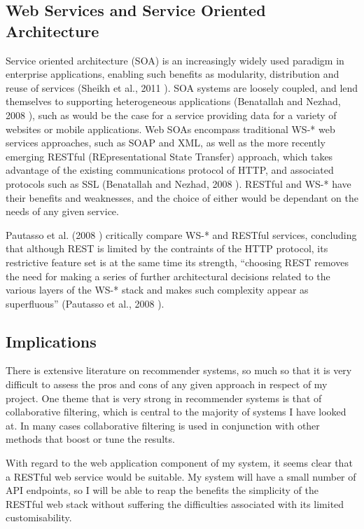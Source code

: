 \subsection{Web Services and Service Oriented Architecture}

Service oriented architecture (SOA) is an increasingly widely used paradigm in enterprise applications, enabling such benefits as modularity, distribution and reuse of services (Sheikh et al., 2011 \cite{Sheikh11}). SOA systems are loosely coupled, and lend themselves to supporting heterogeneous applications (Benatallah and Nezhad, 2008 \cite{Benatallah08}), such as would be the case for a service providing data for a variety of websites or mobile applications. Web SOAs encompass traditional WS-* web services approaches, such as SOAP and XML, as well as the more recently emerging RESTful (REpresentational State Transfer) approach, which takes advantage of the existing communications protocol of HTTP, and associated protocols such as SSL (Benatallah and Nezhad, 2008 \cite{Benatallah08}). RESTful and WS-* have their benefits and weaknesses, and the choice of either would be dependant on the needs of any given service. 

Pautasso et al. (2008 \cite{Pautasso08}) critically compare WS-* and RESTful services, concluding that although REST is limited by the contraints of the HTTP protocol, its restrictive feature set is at the same time its strength, ``choosing REST removes the need for making a series of further architectural decisions related to the various layers of the WS-* stack and makes such complexity appear as superfluous'' (Pautasso et al., 2008 \cite{Pautasso08}).

\subsection{Implications}

There is extensive literature on recommender systems, so much so that it is very difficult to assess the pros and cons of any given approach in respect of my project. One theme that is very strong in recommender systems is that of collaborative filtering, which is central to the majority of systems I have looked at. In many cases collaborative filtering is used in conjunction with other methods that boost or tune the results.

With regard to the web application component of my system, it seems clear that a RESTful web service would be suitable. My system will have a small number of API endpoints, so I will be able to reap the benefits the simplicity of the RESTful web stack without suffering the difficulties associated with its limited customisability.

